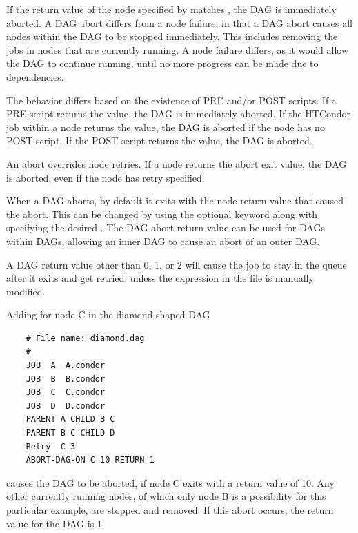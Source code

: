   

If the return value of the node specified by 
matches ,
the DAG is immediately aborted.
A DAG abort differs from a node failure,
in that a DAG abort causes all nodes within the DAG to be stopped immediately.
This includes removing the jobs in nodes that are currently running.
A node failure differs, as it would allow the DAG to continue running,
until no more progress can be made due to dependencies.

The behavior differs based on the existence of PRE and/or POST scripts.
If a PRE script returns the  value,
the DAG is immediately aborted.
If the HTCondor job within a node returns the  value,
the DAG is aborted if the node has no POST script.
If the POST script returns the  value, the DAG is aborted.

An abort overrides node retries. 
If a node returns the abort exit value,
the DAG is aborted,
even if the node has retry specified.

When a DAG aborts, by default it exits with the node return value that
caused the abort.  This can be changed by 
using  the optional  keyword along
with specifying the desired .
The DAG abort return value
can be used for DAGs within DAGs,
allowing an inner DAG to cause an abort of an outer DAG.

A DAG return value other than 0, 1, or 2 will cause the
 job to stay in the queue after it exits
and get retried, unless the  expression in the
 file is manually modified.

Adding  for node C in the diamond-shaped
DAG
\footnotesize
\begin{verbatim}
    # File name: diamond.dag
    #
    JOB  A  A.condor 
    JOB  B  B.condor 
    JOB  C  C.condor	
    JOB  D  D.condor
    PARENT A CHILD B C
    PARENT B C CHILD D
    Retry  C 3
    ABORT-DAG-ON C 10 RETURN 1
\end{verbatim}
\normalsize

causes the DAG to be aborted, if node C exits with a return value of 10.
Any other currently running nodes, 
of which only node B is a possibility for this particular example, 
are stopped and removed.
If this abort occurs, the return value for the DAG is 1.


